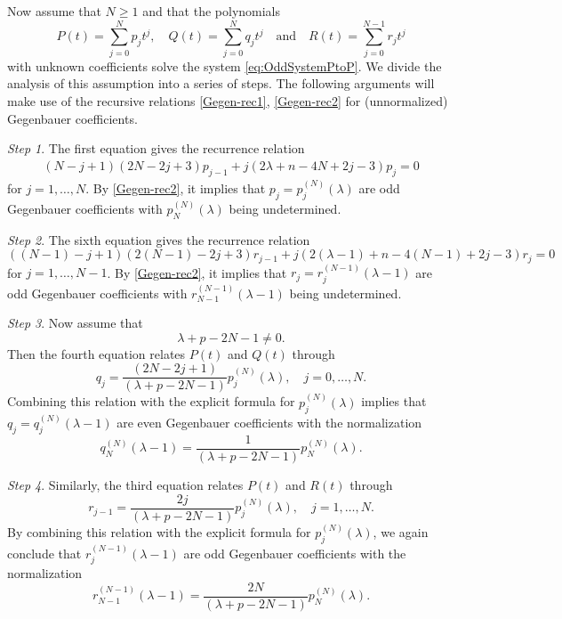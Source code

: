 \documentclass[a4paper,12pt,reqno]{amsart}
\numberwithin{theorem}{subsection}
\numberwithin{equation}{section}
\begin{document}
Now assume that $N \ge 1$ and that the polynomials
$$
   P(t) = \sum_{j=0}^{N} p_j t^j, \quad Q(t) = \sum_{j=0}^{N} q_j t^j \quad
   \mbox{and} \quad R(t) = \sum_{j=0}^{N-1} r_j t^j
$$
with unknown coefficients solve the system \eqref{eq:OddSystemPtoP}. We divide
the analysis of this assumption into a series of steps. The following arguments
will make use of the recursive relations \eqref{Gegen-rec1}, \eqref{Gegen-rec2}
for (unnormalized) Gegenbauer coefficients.

{\em Step 1}. The first equation gives the recurrence relation
\begin{align*}
   (N\!-\!j\!+\!1)(2N\!-\!2j\!+\!3) p_{j-1} + j(2\lambda\!+\!n\!-\!4N\!+\!2j\!-\!3) p_j = 0
\end{align*}
for $j=1,\ldots,N$. By \eqref{Gegen-rec2}, it implies that $p_j =
p^{(N)}_j(\lambda)$ are odd Gegenbauer coefficients with $p_N^{(N)}(\lambda)$
being undetermined.

{\em Step 2}. The sixth equation gives the recurrence relation
\begin{equation*}
   ((N\!-\!1)\!-\!j\!+\!1)(2(N\!-\!1)\!-\!2j\!+\!3) r_{j-1}
   + j(2(\lambda\!-\!1)\!+\!n\!-\!4(N\!-\!1)\!+\!2j\!-\!3 ) r_j = 0
\end{equation*}
for $j=1,\ldots, N\!-\!1$. By \eqref{Gegen-rec2}, it implies that $r_j =
r^{(N-1)}_j(\lambda\!-\!1)$ are odd Gegenbauer coefficients with
$r_{N-1}^{(N-1)}(\lambda\!-\!1)$ being undetermined.

{\em Step 3}. Now assume that
$$
   \lambda\!+\!p\!-\!2N\!-\!1 \ne 0.
$$
Then the fourth equation relates $P(t)$ and $Q(t)$ through
\begin{equation}\label{eq:Relation1}
   q_j = \frac{(2N\!-\!2j\!+\!1)}{(\lambda\!+\!p\!-\!2N\!-\!1)}
   p_j^{(N)}(\lambda), \quad j=0,\dots,N.
\end{equation}
Combining this relation with the explicit formula for $p_j^{(N)}(\lambda)$
implies that $q_j = q_j^{(N)}(\lambda\!-\!1)$ are even Gegenbauer coefficients
with the normalization
\begin{equation}\label{eq:Relation1d}
   q_N^{(N)}(\lambda\!-\!1) = \frac{1}{(\lambda\!+\!p\!-\!2N\!-\!1)} p_N^{(N)}(\lambda).
\end{equation}

{\em Step 4}. Similarly, the third equation relates $P(t)$ and $R(t)$ through
\begin{equation}\label{eq:Relation1a}
   r_{j-1} = \frac{2j}{(\lambda\!+\!p\!-\!2N\!-\!1)} p_{j}^{(N)}(\lambda), \quad j=1,\dots,N.
\end{equation}
By combining this relation with the  explicit formula for $p_j^{(N)}(\lambda)$,
we again conclude that $r_j^{(N-1)}(\lambda\!-\!1)$ are odd Gegenbauer
coefficients with the normalization
\begin{equation}\label{eq:Relation1b}
   r_{N-1}^{(N-1)}(\lambda\!-\!1) = \frac{2N}{(\lambda\!+\!p\!-\!2N\!-\!1)} p_N^{(N)}(\lambda).
\end{equation}
\end{document}
